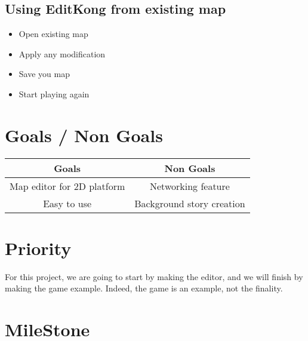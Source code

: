 \subsection{Using EditKong from existing map}

\begin{itemize}
\item Open existing map
\item Apply any modification
\item Save you map
\item Start playing again
\end{itemize}

\section{Goals / Non Goals}

\begin{center}
	\begin{tabular}{| c | c |}
			\hline \rowcolor{LightGrey} Goals & Non Goals \\
			\hline Map editor for 2D platform & Networking feature \\
			\hline Easy to use & Background story creation \\
			\hline
	\end{tabular}
\end{center}

\section{Priority}
For this project, we are going to start by making the editor, and we will finish by making the game example. Indeed, the game is an example, not the finality.
\section{MileStone}
